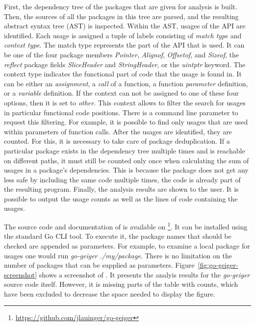 First, the dependency tree of the packages that are given for analysis is built.
Then, the sources of all the packages in this tree are parsed, and the resulting abstract syntax tree (\acrshort{AST})
is inspected.
Within the \acrshort{AST}, usages of the \unsafe{} \acrshort{API} are identified.
Each usage is assigned a tuple of labels consisting of \textit{match type} and \textit{context type}.
The match type represents the part of the \unsafe{} \acrshort{API} that is used.
It can be one of the four \unsafe{} package members \textit{Pointer}, \textit{Alignof}, \textit{Offsetof}, and
\textit{Sizeof}, the \textit{reflect} package fields \textit{SliceHeader} and \textit{StringHeader}, or the
\textit{uintptr} keyword.
The context type indicates the functional part of code that the usage is found in.
It can be either an \textit{assignment}, a \textit{call} of a function, a function \textit{parameter} definition, or a
\textit{variable} definition.
If the context can not be assigned to one of these four options, then it is set to \textit{other}.
This context allows to filter the search for \unsafe{} usages in particular functional code positions.
There is a \toolGeiger{} command line parameter to request this filtering.
For example, it is possible to find only \unsafe{} usages that are used within parameters of function calls.
After the \unsafe{} usages are identified, they are counted.
For this, it is necessary to take care of package deduplication.
If a particular package exists in the dependency tree multiple times and is reachable on different paths, it must still
be counted only once when calculating the sum of \unsafe{} usages in a package's dependencies.
This is because the package does not get any less safe by including the same code multiple times, the code is already
part of the resulting program.
Finally, the analysis results are shown to the user.
It is possible to output the \unsafe{} usage counts as well as the lines of code containing the usages.

The source code and documentation of \toolGeiger{} is available on
\github{}\footnote{\url{https://github.com/jlauinger/go-geiger}}.
It can be installed using the standard Go \acrshort{CLI} tool.
To execute it, the package names that should be checked are appended as parameters.
For example, to examine a local package for \unsafe{} usages one would run \textit{go-geiger ./my/package}.
There is no limitation on the number of packages that can be supplied as parameters.
Figure~\ref{fig:go-geiger-screenshot} shows a screenshot of \toolGeiger{}.
It presents the analyis results for the \textit{go-geiger} source code itself.
However, it is missing parts of the table with \unsafe{} counts, which have been excluded to decrease the space needed
to display the figure.

